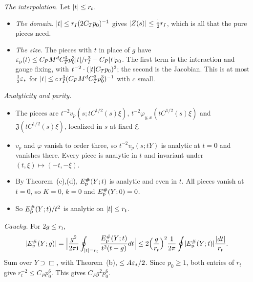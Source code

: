 \begin{detail}\label{xa:d-pure}
\emph{The interpolation.} Let $\lvert t\rvert\le r_t$.
\begin{itemize}
\item \emph{The domain.} $\lvert t\rvert\le r_I(2C_Tp_0)^{-1}$ gives $\lvert Z(s)\rvert\le\frac12r_I$, which is all that the pure pieces need.
\item \emph{The size.} The pieces with $t$ in place of $g$ have $\varepsilon_{\rm p}(t)\le C_PM^dC_T^3p_0^3\lvert t\rvert/r_I^3+C_P\lvert t\rvert p_0$. The first term is the interaction and gauge fixing, with $t^{-2}\cdot(\lvert t\rvert C_Tp_0)^3$; the second is the Jacobian. This is at most $\frac12\varepsilon_*$ for $\lvert t\rvert\le c\,r_I^3(C_PM^dC_T^3p_0^3)^{-1}$ with $c$ small.
\end{itemize}

\emph{Analyticity and parity.}
\begin{itemize}
\item The pieces are $t^{-2}v_p(s;tC^{1/2}(s)\xi)$, $t^{-2}\varphi_{y,x}(tC^{1/2}(s)\xi)$ and $\mathfrak J(tC^{1/2}(s)\xi)$, localized in $s$ at fixed $\xi$.
\item $v_p$ and $\varphi$ vanish to order three, so $t^{-2}v_p(s;tY)$ is analytic at $t=0$ and vanishes there. Every piece is analytic in $t$ and invariant under $(t,\xi)\mapsto(-t,-\xi)$.
\item By Theorem~(c),(d), $E^\#_{\rm p}(Y;t)$ is analytic and even in $t$. All pieces vanish at $t=0$, so $K=0$, $k=0$ and $E^\#_{\rm p}(Y;0)=0$.
\item So $E^\#_{\rm p}(Y;t)/t^2$ is analytic on $\lvert t\rvert\le r_t$.
\end{itemize}

\emph{Cauchy.} For $2g\le r_t$,
\[
\lvert E^\#_{\rm p}(Y;g)\rvert=\Big|\frac{g^2}{2\pi\mathrm i}\oint_{\lvert t\rvert=r_t}\frac{E^\#_{\rm p}(Y;t)}{t^2(t-g)}dt\Big|\le2\Big(\frac g{r_t}\Big)^2\frac1{2\pi}\oint\lvert E^\#_{\rm p}(Y;t)\rvert\frac{\lvert dt\rvert}{r_t}.
\]
Sum over $Y\supset\Box$, with Theorem~(b), $\le A\varepsilon_*/2$. Since $p_0\ge1$, both entries of $r_t$ give $r_t^{-2}\le C_Pp_0^6$. This gives $C_Pg^2p_0^6$.
\end{detail}

